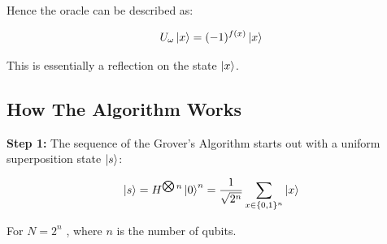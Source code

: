 \documentclass{article}
\begin{document}
Hence the oracle can be described as:
\vspace{5mm}

\begin{equation}
U_\omega\ket{x} = (-1)^{f(x)} \ket{x}    
\end{equation}
\vspace{5mm}

This is essentially a reflection on the state $\ket{x}$.

\pagebreak

\subsection{How The Algorithm Works}
\vspace{5mm}

\textbf{Step 1:}
\vspace{5mm}
\noindent
The sequence of the Grover's Algorithm starts out with a uniform superposition state $\ket{s}$\cite{noauthor_grovers_nodate}:
\vspace{5mm}

\begin{equation}
\ket{s}= H^{\bigotimes n} \ket{0}^n = \frac{1}{\sqrt{2^n}}\sum\limits_{x \in \{0,1\}^n}\ket{x}
\end{equation}
\vspace{5mm}

\qquad For $N = 2^n$ , where $n$ is the number of qubits.
\vspace{5mm}
\end{document}
